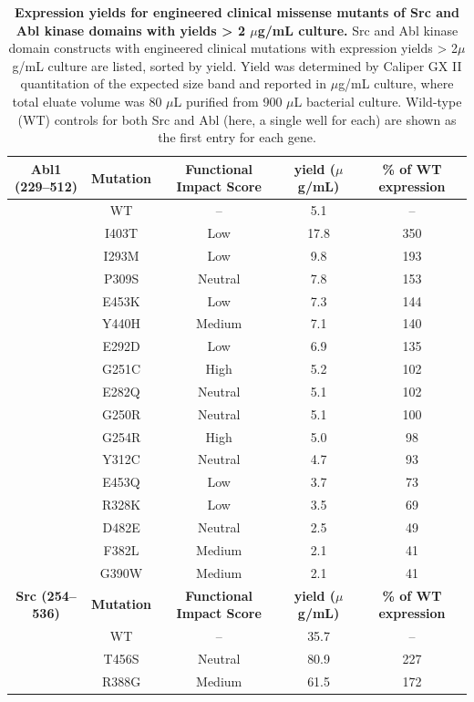 \documentclass[9pt,lineno]{elife}
\begin{document}
\begin{table}[h!]
\centering
\caption{{\bf Expression yields for engineered clinical missense mutants of Src and Abl kinase domains with yields > 2 $\mu$g/mL culture.} 
Src and Abl kinase domain constructs with engineered clinical mutations with expression yields > 2$\mu$g/mL culture are listed, sorted by yield. 
Yield  was determined by Caliper GX II quantitation of the expected size band and reported in $\mu$g/mL culture, where total eluate volume was 80 $\mu$L purified from 900 $\mu$L bacterial culture.
Wild-type (WT) controls for both Src and Abl (here, a single well for each) are shown as the first entry for each gene. 
}
\label{mut-expression_table}
\scriptsize
\begin{threeparttable}
\begin{tabular}{ccccc}
\toprule
\bf{Abl1 (229--512)} & \bf{Mutation}\tnote{1} & \bf{Functional Impact Score}\tnote{2} & \bf{yield ($\mu$g/mL)} & \bf{\% of WT expression} \\ 
\midrule
 & WT & --& 5.1 & -- \\
 & I403T & Low & 17.8 & 350 \\
& I293M & Low &9.8 & 193 \\
 & P309S & Neutral & 7.8 & 153 \\
 & E453K & Low & 7.3 & 144 \\
 & Y440H & Medium & 7.1 & 140 \\
 & E292D & Low & 6.9 & 135 \\
 & G251C & High & 5.2 & 102 \\
 & E282Q & Neutral & 5.1 & 102 \\
 & G250R & Neutral & 5.1 & 100 \\
& G254R & High & 5.0 & 98 \\
 & Y312C & Neutral & 4.7 & 93 \\
& E453Q & Low & 3.7 & 73 \\
& R328K & Low & 3.5 & 69 \\
 & D482E & Neutral & 2.5 & 49 \\
 & F382L & Medium & 2.1 & 41 \\
 & G390W & Medium & 2.1 & 41 \\
\toprule
\bf{Src (254--536) }& \bf{Mutation}\tnote{1} & \bf{Functional Impact Score}\tnote{2} & \bf{yield ($\mu$g/mL)} & \bf{\% of WT expression} \\ 
\midrule
& WT& -- & 35.7 & -- \\
& T456S & Neutral& 80.9 & 227 \\
 &R388G & Medium & 61.5 & 172 \\

\end{tabular}
\end{threeparttable}
\end{table}
\end{document}
